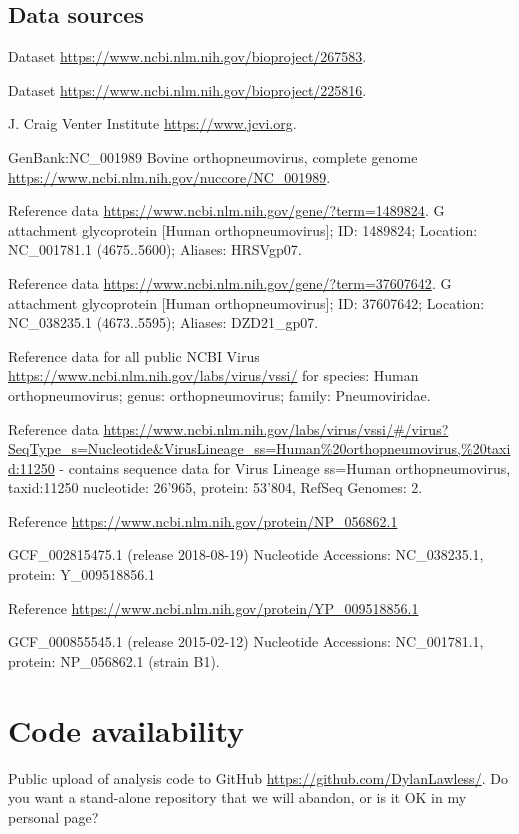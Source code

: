 \documentclass{article} %
\begin{document}
\subsection{Data sources}
\begin{description}[noitemsep]
\item Dataset \url{https://www.ncbi.nlm.nih.gov/bioproject/267583}.
\item Dataset \url{https://www.ncbi.nlm.nih.gov/bioproject/225816}.
\item J. Craig Venter Institute \url{https://www.jcvi.org}.
\item GenBank:NC\_001989 Bovine orthopneumovirus, complete genome \url{https://www.ncbi.nlm.nih.gov/nuccore/NC_001989}.
\item Reference data \url{https://www.ncbi.nlm.nih.gov/gene/?term=1489824}.
G attachment glycoprotein [Human orthopneumovirus]; ID: 1489824; Location: NC\_001781.1 (4675..5600); Aliases: HRSVgp07.
\item Reference data \url{https://www.ncbi.nlm.nih.gov/gene/?term=37607642}. 
G attachment glycoprotein [Human orthopneumovirus]; ID: 37607642; Location: NC\_038235.1 (4673..5595); Aliases: DZD21\_gp07.
\item Reference data for all public NCBI Virus 
\url{https://www.ncbi.nlm.nih.gov/labs/virus/vssi/} for species: Human orthopneumovirus; genus: orthopneumovirus; family: Pneumoviridae.
\item Reference data \url{https://www.ncbi.nlm.nih.gov/labs/virus/vssi/#/virus?SeqType_s=Nucleotide&VirusLineage_ss=Human\%20orthopneumovirus,\%20taxid:11250}
- contains sequence data for 
Virus Lineage ss=Human orthopneumovirus, taxid:11250
nucleotide: 26’965, 
protein: 53’804, 
RefSeq Genomes: 2.
\item Reference \url{https://www.ncbi.nlm.nih.gov/protein/NP_056862.1}
\item GCF\_002815475.1	(release 2018-08-19) Nucleotide Accessions: NC\_038235.1, protein: Y\_009518856.1
\item Reference \url{https://www.ncbi.nlm.nih.gov/protein/YP_009518856.1}
\item GCF\_000855545.1	(release 2015-02-12) Nucleotide Accessions: NC\_001781.1, protein: NP\_056862.1 (strain B1).
\end{description}

\section{Code availability}
Public upload of analysis code to GitHub \url{https://github.com/DylanLawless/}.
Do you want a stand-alone repository that we will abandon, or is it OK in my personal page?
\end{document}
